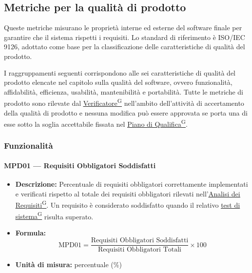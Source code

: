 \documentclass[a4paper,12pt]{article}
\providecommand{\glslink}[2]{\href{https://alittlebyte-19.github.io/Documentazione/glossario.html\#gls-#1}{\underline{#2}\textsuperscript{\scriptsize G}}}
\begin{document}
\subsection{Metriche per la qualità di prodotto}
Queste metriche misurano le proprietà interne ed esterne del software finale per garantire che il sistema rispetti i requisiti. Lo standard di riferimento è ISO/IEC 9126, adottato come base per la classificazione delle caratteristiche di qualità del prodotto.

I raggruppamenti seguenti corrispondono alle sei caratteristiche di qualità del prodotto elencate nel capitolo sulla qualità del software, ovvero funzionalità, affidabilità, efficienza, usabilità, mantenibilità e portabilità. Tutte le metriche di prodotto sono rilevate dal \glslink{verificatore}{Verificatore} nell'ambito dell'attività di accertamento della qualità di prodotto e nessuna modifica può essere approvata se porta una di esse sotto la soglia accettabile fissata nel \glslink{piano-di-qualifica}{Piano di Qualifica}.

\subsubsection{Funzionalità}

\paragraph{MPD01 --- Requisiti Obbligatori Soddisfatti}
\begin{itemize}
    \item \textbf{Descrizione:} Percentuale di requisiti obbligatori correttamente implementati e verificati rispetto al totale dei requisiti obbligatori rilevati nell'\glslink{analisi-dei-requisiti-adr}{Analisi dei Requisiti}. Un requisito è considerato soddisfatto quando il relativo \glslink{test-di-sistema}{test di sistema} risulta superato.
    \item \textbf{Formula:}
    $$\text{MPD01} = \frac{\text{Requisiti Obbligatori Soddisfatti}}{\text{Requisiti Obbligatori Totali}} \times 100$$
    \item \textbf{Unità di misura:} percentuale (\%)
\end{itemize}
\end{document}
